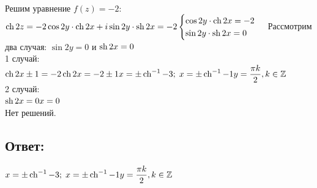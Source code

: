 \\
Решим уравнение $ f(z) = -2 $:\\
$
	\operatorname{ch} 2z = -2
	\\[1em]
	\cos 2y \cdot \operatorname{ch} 2x + i \sin 2y \cdot \operatorname{sh} 2x = -2
	\\[1em]
	\begin{cases}
		\cos 2y \cdot \operatorname{ch} 2x = -2 \\
		\sin 2y \cdot \operatorname{sh} 2x = 0
	\end{cases}
	\\[1em]
$
Рассмотрим два случая: $ \sin 2y = 0 $ и $ \operatorname{sh} 2x = 0 $
\\[1em]
1 случай:
\\[1em]
$
	\operatorname{ch} 2x \pm 1 = -2
	\\[1em]
	\operatorname{ch} 2x = -2 \pm 1
	\\[1em]
	x = \pm \operatorname{ch}^{-1} -3; \; x = \pm \operatorname{ch}^{-1} -1
	\\
	y = \dfrac{\pi k}{2}, k \in \mathbb{Z}
$
\\[1em]
2 случай:
\\[1em]
$
	\operatorname{sh} 2x = 0
	\\[1em]
	x = 0
$
\\[1em]
Нет решений.
\subsection{Ответ:}
$
	x = \pm \operatorname{ch}^{-1} -3; \; x = \pm \operatorname{ch}^{-1} -1
	\\
	y = \dfrac{\pi k}{2}, k \in \mathbb{Z}
$
